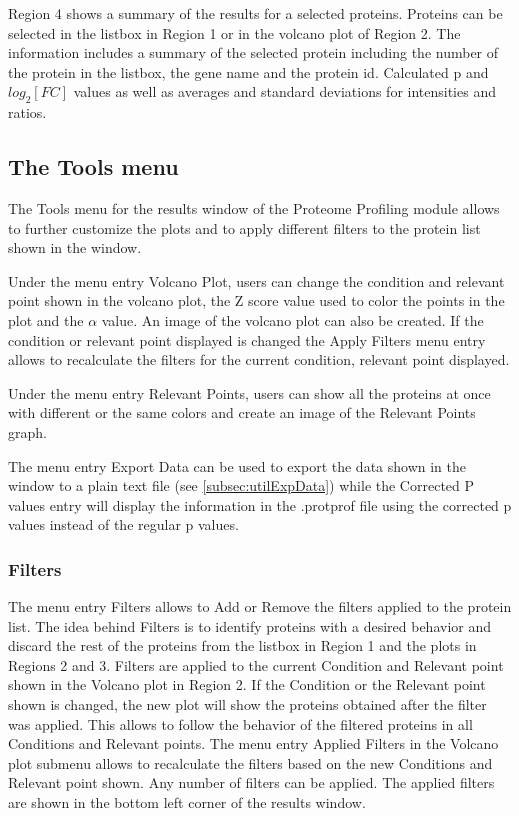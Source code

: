 Region \num{4} shows a summary of the results for a selected proteins. Proteins can be selected in the listbox in Region \num{1} or in the volcano plot of Region \num{2}. The information includes a summary of the selected protein including the number of the protein in the listbox, the gene name and the protein id. Calculated p and $log_2[FC]$ values as well as averages and standard deviations for intensities and ratios.

\subsection{The Tools menu}
\label{sec:protprofTools}

The Tools menu for the results window of the Proteome Profiling module allows to further customize the plots and to apply different filters to the protein list shown in the window.

Under the menu entry Volcano Plot, users can change the condition and relevant point shown in the volcano plot, the Z score value used to color the points in the plot and the $\alpha$ value. An image of the volcano plot can also be created. If the condition or relevant point displayed is changed the Apply Filters menu entry allows to recalculate the filters for the current condition, relevant point displayed.

Under the menu entry Relevant Points, users can show all the proteins at once with different or the same colors and create an image of the Relevant Points graph.

The menu entry Export Data can be used to export the data shown in the window to a plain text file (see \autoref{subsec:utilExpData}) while the Corrected P values entry will display the information in the .protprof file using the corrected p values instead of the regular p values.

\subsubsection{Filters}

The menu entry Filters allows to Add or Remove the filters applied to the protein list. The idea behind Filters is to identify proteins with a desired behavior and discard the rest of the proteins from the listbox in Region \num{1} and the plots in Regions \num{2} and \num{3}. Filters are applied to the current Condition and Relevant point shown in the Volcano plot in Region \num{2}. If the Condition or the Relevant point shown is changed, the new plot will show the proteins obtained after the filter was applied. This allows to follow the behavior of the filtered proteins in all Conditions and Relevant points. The menu entry Applied Filters in the Volcano plot submenu allows to recalculate the filters based on the new Conditions and Relevant point shown. Any number of filters can be applied. The applied filters are shown in the bottom left corner of the results window. 

